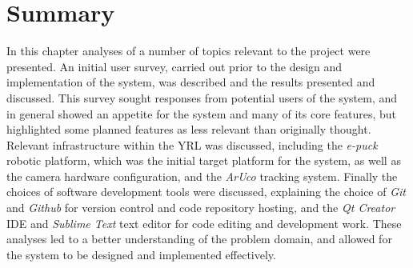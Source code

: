 
\section{Summary}
In this chapter analyses of a number of topics relevant to the project were presented. An initial user survey, carried out prior to the design and implementation of the system, was described and the results presented and discussed. This survey sought responses from potential users of the system, and in general showed an appetite for the system and many of its core features, but highlighted some planned features as less relevant than originally thought. Relevant infrastructure within the YRL was discussed, including the \textit{e-puck} robotic platform, which was the initial target platform for the system, as well as the camera hardware configuration, and the \textit{ArUco} tracking system. Finally the choices of software development tools were discussed, explaining the choice of \textit{Git} and \textit{Github} for version control and code repository hosting, and the \textit{Qt Creator} IDE and \textit{Sublime Text} text editor for code editing and development work. These analyses led to a better understanding of the problem domain, and allowed for the system to be designed and implemented effectively.